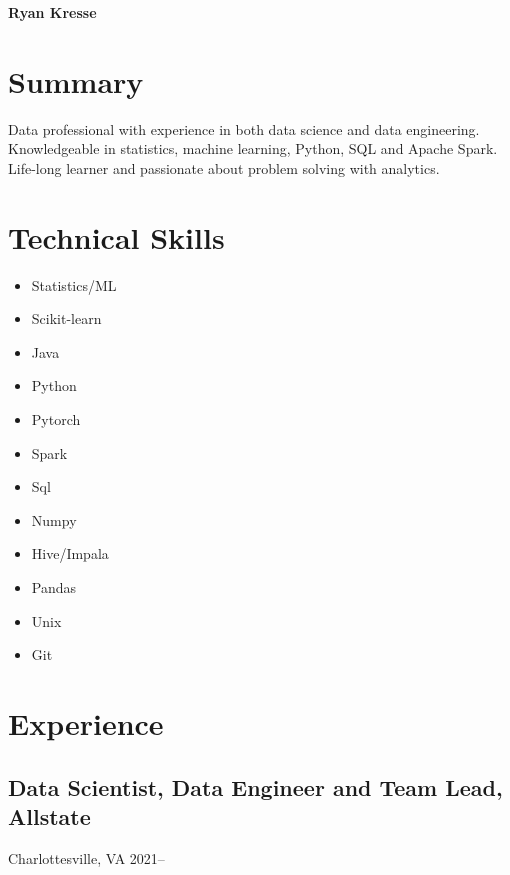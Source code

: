\documentclass[11pt]{article}
\begin{document}
	\noindent \textbf{{\fontsize{38pt}{\parskip}\selectfont \color{RyanRed} Ryan Kresse}}
	\smallskip


	\section{Summary}
	Data professional with experience in both data science and data engineering. Knowledgeable in statistics, machine learning, Python, SQL and Apache Spark. Life-long learner and passionate about problem solving with analytics.
	\section{Technical Skills}
		\begin{multicols}{4}
				\begin{itemize}
				\item Statistics/ML
				\item Scikit-learn
				\item Java

				\columnbreak
				\item Python
				\item Pytorch
				\item Spark

				\columnbreak
				\item Sql
				\item Numpy
				\item Hive/Impala

				\columnbreak
				\item Pandas
				\item Unix
				\item Git
				\columnbreak

			\end{itemize}
		\end{multicols}



	\section{Experience}

	\subsection{\normalsize{Data Scientist, Data Engineer and Team Lead, Allstate}}
	{\fontsize{10pt}{\parskip}\selectfont Charlottesville, VA 2021--}
\end{document}
